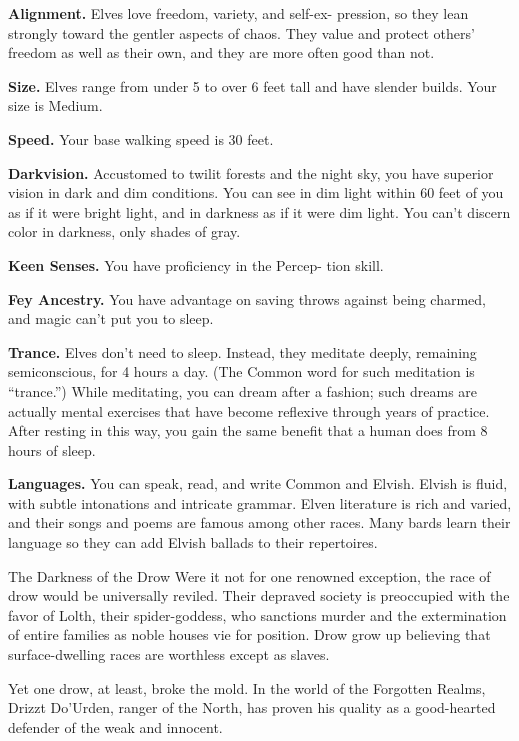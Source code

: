 \textbf{Alignment.} Elves love freedom, variety, and self-ex- pression, so they lean strongly toward the gentler aspects of chaos. They value and protect others’ freedom as well as their own, and they are more often good than not.

\textbf{Size.} Elves range from under 5 to over 6 feet tall and have slender builds. Your size is Medium.

\textbf{Speed.} Your base walking speed is 30 feet.

\textbf{Darkvision.} Accustomed to twilit forests and the night sky, you have superior vision in dark and dim conditions. You can see in dim light within 60 feet of you as if it were bright light, and in darkness as if it were dim light. You can’t discern color in darkness, only shades of gray.

\textbf{Keen Senses.} You have proficiency in the Percep- tion skill.

\textbf{Fey Ancestry.} You have advantage on saving throws against being charmed, and magic can’t put you to sleep.

\textbf{Trance.} Elves don’t need to sleep. Instead, they meditate deeply, remaining semiconscious, for 4 hours a day. (The Common word for such meditation is ``trance.'') While meditating, you can dream after a fashion; such dreams are actually mental exercises that have become reflexive through years of practice. After resting in this way, you gain the same benefit that a human does from 8 hours of sleep.

\textbf{Languages.} You can speak, read, and write Common and Elvish. Elvish is fluid, with subtle intonations and intricate grammar. Elven literature is rich and varied, and their songs and poems are famous among other races. Many bards learn their language so they can add Elvish ballads to their repertoires.

\begin{DndSidebar}[float=!b]{The Darkness of the Drow}
Were it not for one renowned exception, the race of drow would be universally reviled. Their depraved society is preoccupied with the favor of Lolth, their spider-goddess, who sanctions murder and the extermination of entire families as noble houses vie for position. Drow grow
up believing that surface-dwelling races are worthless except as slaves.

Yet one drow, at least, broke the mold. In the world of the Forgotten Realms, Drizzt Do’Urden, ranger of the North, has proven his quality as a good-hearted defender of the weak and innocent.
\end{DndSidebar}

